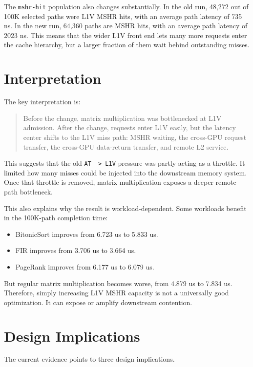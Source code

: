 \documentclass[sigconf,screen,review]{acmart}
\begin{document}
The \texttt{mshr-hit} population also changes substantially.  In the old run,
48,272 out of 100K selected paths were L1V MSHR hits, with an average path
latency of 735 ns.  In the new run, 64,360 paths are MSHR hits, with an
average path latency of 2023 ns.  This means that the wider L1V front end lets
many more requests enter the cache hierarchy, but a larger fraction of them
wait behind outstanding misses.

\section{Interpretation}

The key interpretation is:

\begin{quote}
Before the change, matrix multiplication was bottlenecked at L1V admission.
After the change, requests enter L1V easily, but the latency center shifts to
the L1V miss path: MSHR waiting, the cross-GPU request transfer, the
cross-GPU data-return transfer, and remote L2 service.
\end{quote}

This suggests that the old \texttt{AT -> L1V} pressure was partly acting as a
throttle.  It limited how many misses could be injected into the downstream
memory system.  Once that throttle is removed, matrix multiplication exposes a
deeper remote-path bottleneck.

This also explains why the result is workload-dependent.  Some workloads
benefit in the 100K-path completion time:

\begin{itemize}
  \item BitonicSort improves from 6.723 us to 5.833 us.
  \item FIR improves from 3.706 us to 3.664 us.
  \item PageRank improves from 6.177 us to 6.079 us.
\end{itemize}

But regular matrix multiplication becomes worse, from 4.879 us to 7.834 us.
Therefore, simply increasing L1V MSHR capacity is not a universally good
optimization.  It can expose or amplify downstream contention.

\section{Design Implications}

The current evidence points to three design implications.
\end{document}
